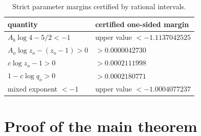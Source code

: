 \documentclass[11pt]{article}
\begin{document}
\begin{table}[ht]
\centering
\begin{tabular}{ll}
\hline
quantity & certified one-sided margin\\
\hline
\(A_b\log4-5/2<-1\)
  & upper value \(<-1.1137042525\)\\
\(A_o\log z_o-(z_o-1)>0\)
  & \(>0.0000042730\)\\
\(c\log z_o-1>0\)
  & \(>0.0002111998\)\\
\(1-c\log q_o>0\)
  & \(>0.0002180771\)\\
mixed exponent \(<-1\)
  & upper value \(<-1.0004077237\)\\
\hline
\end{tabular}
\caption{Strict parameter margins certified by rational intervals.}
\label{tab:margins}
\end{table}

\section{Proof of the main theorem}\label{sec:assembly}
\end{document}
